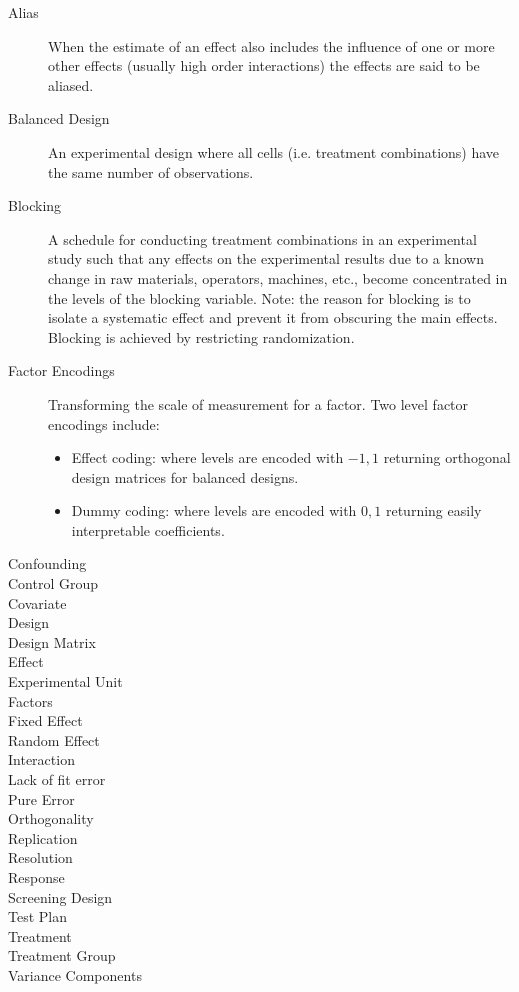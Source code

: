 \begin{description}
\item [Alias] When the estimate of an effect also includes the influence of one or more other effects (usually high order interactions) the effects are said to be aliased.
\item [Balanced Design] An experimental design where all cells (i.e. treatment combinations) have the same number of observations.
\item [Blocking] A schedule for conducting treatment combinations in an experimental study such that any effects on the experimental results due to a known change in raw materials, operators, machines, etc., become concentrated in the levels of the blocking variable. Note: the reason for blocking is to isolate a systematic effect and prevent it from obscuring the main effects. Blocking is achieved by restricting randomization.
\item [Factor Encodings] Transforming the scale of measurement for a factor. 
Two level factor encodings include:
\begin{itemize}
\item Effect coding: where levels are encoded with $-1,1$ returning orthogonal design matrices for balanced designs.
\item Dummy coding: where levels are encoded with $0,1$ returning easily interpretable coefficients.
\end{itemize}

\item [Confounding]
\item [Control Group]
\item [Covariate]
\item [Design]
\item [Design Matrix]
\item [Effect]
\item [Experimental Unit]
\item [Factors]
\item [Fixed Effect]
\item [Random Effect]
\item [Interaction]
\item [Lack of fit error]
\item [Pure Error]
\item [Orthogonality]
\item [Replication]
\item [Resolution]
\item [Response]
\item [Screening Design]
\item [Test Plan]
\item [Treatment]
\item [Treatment Group]
\item [Variance Components]
\end{description}




